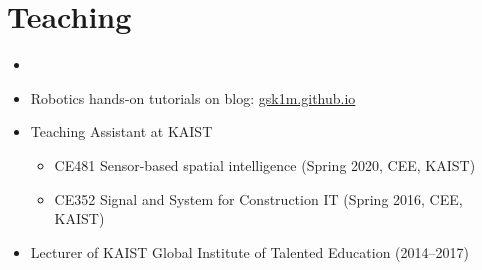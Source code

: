\section{Teaching}

\begin{itemize}[label=$\cdot$]
    \item  

        \vspace{-3mm}
    \item Robotics hands-on tutorials on blog: \href{https://gsk1m.github.io}{gsk1m.github.io}
        \vspace{-1mm}
    \item Teaching Assistant at KAIST
        \vspace{-1mm}
        \begin{itemize}[label=$\cdot$]
        \item CE481 Sensor-based spatial intelligence (Spring 2020, CEE, KAIST)
        \vspace{-1mm}
        \item CE352 Signal and System for Construction IT (Spring 2016, CEE, KAIST)
    \end{itemize}
        \vspace{-1mm}
    \item Lecturer of KAIST Global Institute of Talented Education (2014--2017)
\end{itemize}